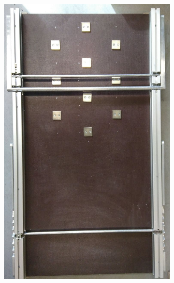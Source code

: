 \begin{figure}[tb]
\begin{subfigure}[c]{0.4315\linewidth}
		\includegraphics[width=\linewidth]{Bilder/magneten_an_rampe1_geschnitten.jpg}
	\end{subfigure}
	\hfill
	\caption{}
	\label{nao_und_rampe}
\end{figure}

